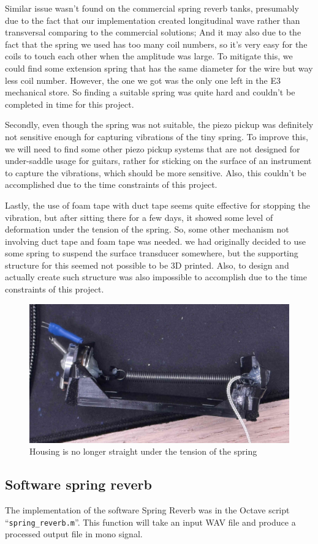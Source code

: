 \documentclass[12pt]{article}
\begin{document}
Similar issue wasn't found on the commercial spring reverb tanks, presumably due to the fact that our implementation created longitudinal wave rather than transversal comparing to the commercial solutions; And it may also due to the fact that the spring we used has too many coil numbers, so it's very easy for the coils to touch each other when the amplitude was large. To mitigate this, we could find some extension spring that has the same diameter for the wire but way less coil number. However, the one we got was the only one left in the E3 mechanical store. So finding a suitable spring was quite hard and couldn't be completed in time for this project. 

Secondly, even though the spring was not suitable, the piezo pickup was definitely not sensitive enough for capturing vibrations of the tiny spring. To improve this, we will need to find some other piezo pickup systems that are not designed for under-saddle usage for guitars, rather for sticking on the surface of an instrument to capture the vibrations, which should be more sensitive. Also, this couldn't be accomplished due to the time constraints of this project.

Lastly, the use of foam tape with duct tape seems quite effective for stopping the vibration, but after sitting there for a few days, it showed some level of deformation under the tension of the spring. So, some other mechanism not involving duct tape and foam tape was needed. we had originally decided to use some spring to suspend the surface transducer somewhere, but the supporting structure for this seemed not possible to be 3D printed. Also, to design and actually create such structure was also impossible to accomplish due to the time constraints of this project.

\begin{figure}[h] 
	\center 
	\includegraphics[width=0.5\linewidth]{deformation.jpg} 
	\caption{Housing is no longer straight under the tension of the spring} 
\end{figure} 

\newpage
\subsection{Software spring reverb}
The implementation of the software Spring Reverb was in the Octave script ``\texttt{spring\_reverb.m}''. This function will take an input WAV file and produce a processed output file in mono signal. 
\end{document}
